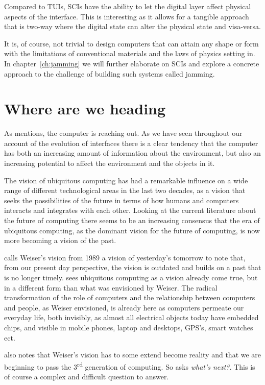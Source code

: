 Compared to TUIs, SCIs have the ability to let the digital layer affect physical aspects of the interface.
This is interesting as it allows for a tangible approach that is two-way where the digital state can alter the physical state and visa-versa.

It is, of course, not trivial to design computers that can attain any shape or form with the limitations of conventional materials and the laws of physics setting in.
In chapter~\ref{ch:jamming} we will further elaborate on SCIs and explore a concrete approach to the challenge of building such systems called jamming.

\section{Where are we heading}
As \citet{grudin1990computer} mentions, the computer is reaching out.
As we have seen throughout our account of the evolution of interfaces there is a clear tendency that the computer has both an increasing amount of information about the environment, but also an increasing potential to affect the environment and the objects in it.  

The vision of ubiquitous computing has had a remarkable influence on a wide range of different technological areas in the last two decades, as a vision that seeks the possibilities of the future in terms of how humans and computers interacts and integrates with each other.
Looking at the current literature about the future of computing there seems to be an increasing consensus that the era of ubiquitous computing, as the dominant vision for the future of computing, is now more becoming a vision of the past.

\citet{bell2007yesterday} calls Weiser's vision from 1989 a vision of yesterday's tomorrow to note that, from our present day perspective, the vision is outdated and builds on a past that is no longer timely.
\citeauthor{bell2007yesterday} sees ubiquitous computing as a vision already come true, but in a different form than what was envisioned by Weiser.
The radical transformation of the role of computers and the relationship between computers and people, as Weiser envisioned, is already here as computers permeate our everyday life, both invisibly, as almost all electrical objects today have embedded chips, and visible in mobile phones, laptop and desktops, GPS's, smart watches ect.

\citet{abowd2012next} also notes that Weiser's vision has to some extend become reality and that we are beginning to pass the 3\textsuperscript{rd} generation of computing.
So \citeauthor{abowd2012next} asks \textit{what's next?}.
This is of course a complex and difficult question to answer.

